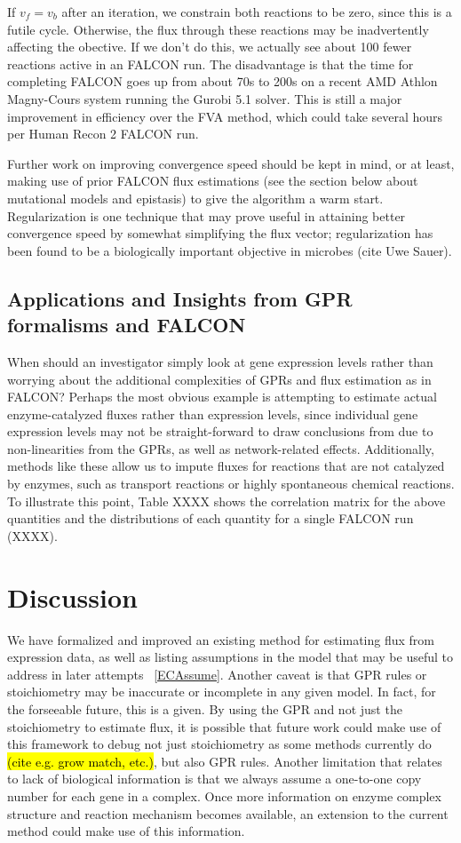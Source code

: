 \documentclass[phd,tocprelim]{cornell}
\theoremstyle{break}
\theoremstyle{empty}
\begin{document}
If $v_f = v_b$ after an iteration, we constrain both reactions to be zero, since this
is a futile cycle. Otherwise, the flux through these reactions may be inadvertently affecting
the obective. If we don't do this, we actually see about 100 fewer reactions active in an FALCON run.
The disadvantage is that the time for completing FALCON goes up from about 70s to 200s on a recent
AMD Athlon Magny-Cours system running the Gurobi 5.1 solver. This is still a major improvement 
in efficiency over the FVA method, which could take several hours per Human Recon 2 FALCON run.

Further work on improving convergence speed should be kept in mind, or
at least, making use of prior FALCON flux estimations (see the section
below about mutational models and epistasis) to give the algorithm a
warm start.  Regularization is one technique that may prove useful in
attaining better convergence speed by somewhat simplifying the flux
vector; regularization has been found to be a biologically important
objective in microbes (cite Uwe Sauer).




\subsection{Applications and Insights from GPR formalisms and FALCON}
When should an investigator simply look at gene expression levels rather than
worrying about the additional complexities of GPRs and flux estimation as in FALCON?
Perhaps the most obvious example is attempting to estimate actual enzyme-catalyzed 
fluxes rather than expression levels, since individual gene expression levels
may not be straight-forward to draw conclusions from due to non-linearities
from the GPRs, as well as network-related effects. Additionally, methods like these
allow us to impute fluxes for reactions that are not catalyzed by enzymes,
such as transport reactions or highly spontaneous chemical reactions. To illustrate
this point, Table XXXX shows the correlation matrix for the above quantities and 
the distributions of each quantity for a single FALCON run (XXXX).

\section{Discussion}
We have formalized and improved an existing method for estimating flux
from expression data, as well as listing assumptions in the model that
may be useful to address in later attempts ~\ref{ECAssume}. Another
caveat is that GPR rules or stoichiometry may be inaccurate or
incomplete in any given model. In fact, for the forseeable future,
this is a given. By using the GPR and not just the stoichiometry to
estimate flux, it is possible that future work could make use of this
framework to debug not just stoichiometry as some methods currently do
\hl{(cite e.g. grow match, etc.)}, but also GPR rules.
Another limitation that relates to lack of biological information is
that we always assume a one-to-one copy number for each gene in a
complex. Once more information on enzyme complex structure and
reaction mechanism becomes available, an extension to the current
method could make use of this information.
\end{document}
